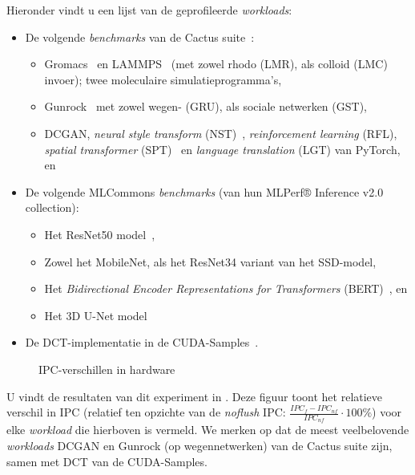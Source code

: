 \documentclass[5p,numvwe]{elsarticle}
\begin{document}
    Hieronder vindt u een lijst van de geprofileerde \textit{workloads}:
    \begin{itemize}
        \item De volgende \textit{benchmarks} van de Cactus suite~\cite{cactus}:
        \begin{itemize}
            \item Gromacs~\cite{gromacs} en LAMMPS~\cite{LAMMPS} (met zowel rhodo (LMR), als colloid (LMC) invoer); twee moleculaire simulatieprogramma's,
            \item Gunrock~\cite{gru} met zowel wegen- (GRU), als sociale netwerken (GST),
            \item DCGAN, \textit{neural style transform} (NST)~\cite{nst}, \textit{reinforcement learning} (RFL), \textit{spatial transformer} (SPT)~\cite{spt} en \textit{language translation} (LGT) van PyTorch, en
        \end{itemize}
        \item De volgende MLCommons \textit{benchmarks} (van hun MLPerf® Inference v2.0 collection):
        \begin{itemize}
            \item Het ResNet50 model~\cite{resnet50},
            \item Zowel het MobileNet, als het ResNet34 variant van het SSD-model,
            \item Het \textit{Bidirectional Encoder Representations for Transformers} (BERT)~\cite{bert}, en
            \item Het 3D U-Net model~\cite{3d-unet}
        \end{itemize}
        \item De DCT-implementatie in de CUDA-Samples~\cite{samples}.
    \end{itemize}

    \begin{figure}[ht]
        \centering
        \caption{IPC-verschillen in hardware}
        \label{fig:hw-ipc}
    \end{figure}

    U vindt de resultaten van dit experiment in .
    Deze figuur toont het relatieve verschil in IPC (relatief ten opzichte van de \textit{noflush} IPC: $\frac{IPC_f - IPC_{nf}}{IPC_{nf}} \cdot 100\%$) voor elke \textit{workload} die hierboven is vermeld.
    We merken op dat de meest veelbelovende \textit{workloads} DCGAN en Gunrock (op wegennetwerken) van de Cactus suite zijn, samen met DCT van de CUDA-Samples.
\end{document}
